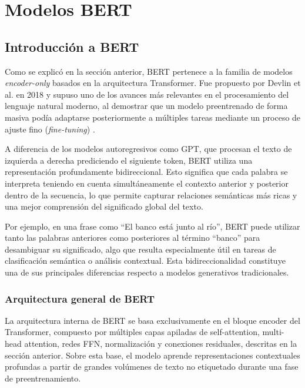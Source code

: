 \section{Modelos BERT}

\subsection{Introducción a BERT}

Como se explicó en la sección anterior, \ac{BERT} pertenece a la familia de modelos \textit{encoder-only} basados en la arquitectura Transformer. Fue propuesto por Devlin et al. en 2018 y supuso uno de los avances más relevantes en el procesamiento del lenguaje natural moderno, al demostrar que un modelo preentrenado de forma masiva podía adaptarse posteriormente a múltiples tareas mediante un proceso de ajuste fino (\textit{fine-tuning}) \cite{devlin_bert_2019}.

A diferencia de los modelos autoregresivos como \ac{GPT}, que procesan el texto de izquierda a derecha prediciendo el siguiente token, \ac{BERT} utiliza una representación profundamente bidireccional. Esto significa que cada palabra se interpreta teniendo en cuenta simultáneamente el contexto anterior y posterior dentro de la secuencia, lo que permite capturar relaciones semánticas más ricas y una mejor comprensión del significado global del texto.

Por ejemplo, en una frase como ``El banco está junto al río'', \ac{BERT} puede utilizar tanto las palabras anteriores como posteriores al término ``banco'' para desambiguar su significado, algo que resulta especialmente útil en tareas de clasificación semántica o análisis contextual. Esta bidireccionalidad constituye una de sus principales diferencias respecto a modelos generativos tradicionales.

\subsubsection{Arquitectura general de BERT}

La arquitectura interna de \ac{BERT} se basa exclusivamente en el bloque encoder del Transformer, compuesto por múltiples capas apiladas de self-attention, multi-head attention, redes \ac{FFN}, normalización y conexiones residuales, descritas en la sección anterior. Sobre esta base, el modelo aprende representaciones contextuales profundas a partir de grandes volúmenes de texto no etiquetado durante una fase de preentrenamiento.

